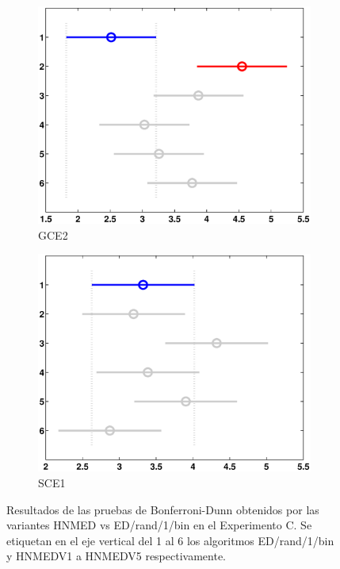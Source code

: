 \begin{figure}
\begin{subfigure}[b]{0.49\linewidth}
		\includegraphics[width=\linewidth]{Figures/C-Bonferroni_HNMED_VS_ED5}
		\caption{GCE2} \label{fig:Bon_G2} 
	\end{subfigure}
	\begin{subfigure}[b]{0.49\linewidth}
		\includegraphics[width=\linewidth]{Figures/C-Bonferroni_HNMED_VS_ED6}
		\caption{SCE1} \label{fig:Bon_S1} 
	\end{subfigure}
	\caption[Resultados de las pruebas de Bonferroni-Dunn  obtenidos por las variantes HNMED vs ED/rand/1/bin en el Experimento C.]{Resultados de las pruebas de Bonferroni-Dunn  obtenidos por las variantes HNMED vs ED/rand/1/bin en el Experimento C. Se etiquetan en el eje vertical del 1 al 6 los algoritmos ED/rand/1/bin y HNMEDV1 a HNMEDV5   respectivamente.} \label{fig: Resultados de las pruebas de Bonferroni-Dunn para las variantes HNMED vs ED/rand/1/bin en el experimento C.} 
	
\end{figure}
